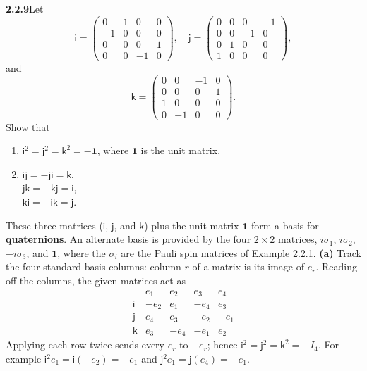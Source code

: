 \par\bigskip
\noindent\textbf{2.2.9}\quad Let
\[
\mathsf{i}=\begin{pmatrix}0&1&0&0\\-1&0&0&0\\0&0&0&1\\0&0&-1&0\end{pmatrix},\quad
\mathsf{j}=\begin{pmatrix}0&0&0&-1\\0&0&-1&0\\0&1&0&0\\1&0&0&0\end{pmatrix},
\]
and
\[
\mathsf{k}=\begin{pmatrix}0&0&-1&0\\0&0&0&1\\1&0&0&0\\0&-1&0&0\end{pmatrix}.
\]
Show that
\begin{enumerate}
\item[(a)] $\mathsf{i}^{2}=\mathsf{j}^{2}=\mathsf{k}^{2}=-\mathbf{1}$, where
  $\mathbf{1}$ is the unit matrix.
\item[(b)] $\mathsf{ij}=-\mathsf{ji}=\mathsf{k}$,\\
  $\mathsf{jk}=-\mathsf{kj}=\mathsf{i}$,\\
  $\mathsf{ki}=-\mathsf{ik}=\mathsf{j}$.
\end{enumerate}
These three matrices ($\mathsf{i}$, $\mathsf{j}$, and $\mathsf{k}$) plus the
unit matrix $\mathbf{1}$ form a basis for \textbf{quaternions}. An alternate
basis is provided by the four $2\times2$ matrices, $i\sigma_{1}$, $i\sigma_{2}$,
$-i\sigma_{3}$, and $\mathbf{1}$, where the $\sigma_{i}$ are the Pauli spin
matrices of Example 2.2.1.
\solution
\textbf{(a)} Track the four standard basis columns: column $r$ of a
matrix is its image of $e_r$. Reading off the columns, the given
matrices act as
\[
\begin{array}{c|rrrr}
&e_1&e_2&e_3&e_4\\\hline
\mathsf i&-e_2&e_1&-e_4&e_3\\
\mathsf j&e_4&e_3&-e_2&-e_1\\
\mathsf k&e_3&-e_4&-e_1&e_2
\end{array}
\]
Applying each row twice sends every $e_r$ to $-e_r$; hence
$\mathsf i^2=\mathsf j^2=\mathsf k^2=-I_4$.
For example $\mathsf i^2e_1=\mathsf i(-e_2)=-e_1$ and
$\mathsf j^2e_1=\mathsf j(e_4)=-e_1$.

